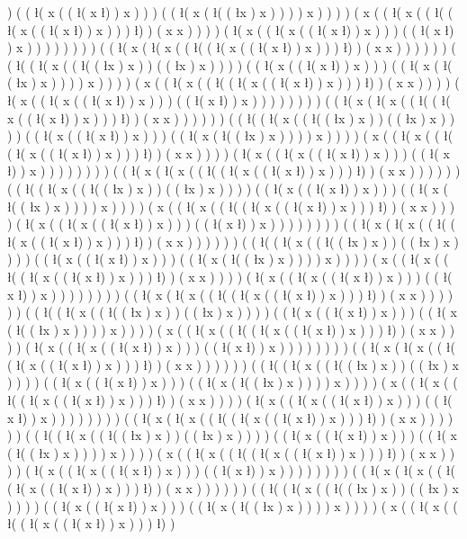 ) ( ( \l ( x ( ( \l ( x \l ) ) x ) ) ) ( ( \l ( x ( \l ( ( \l x ) x ) ) ) ) x ) ) ) ) ( x ( ( \l ( x ( ( \l ( ( \l ( x ( ( \l ( x \l ) ) x ) ) ) \l ) ) ( x x ) ) ) ) ( \l ( x ( ( \l ( x ( ( \l ( x \l ) ) x ) ) ) ( ( \l ( x \l ) ) x ) ) ) ) ) ) ) ) ( ( \l ( x ( \l ( x ( ( \l ( ( \l ( x ( ( \l ( x \l ) ) x ) ) ) \l ) ) ( x x ) ) ) ) ) ) ( ( \l ( ( \l ( x ( ( \l ( ( \l x ) x ) ) ( ( \l x ) x ) ) ) ) ( ( \l ( x ( ( \l ( x \l ) ) x ) ) ) ( ( \l ( x ( \l ( ( \l x ) x ) ) ) ) x ) ) ) ) ( x ( ( \l ( x ( ( \l ( ( \l ( x ( ( \l ( x \l ) ) x ) ) ) \l ) ) ( x x ) ) ) ) ( \l ( x ( ( \l ( x ( ( \l ( x \l ) ) x ) ) ) ( ( \l ( x \l ) ) x ) ) ) ) ) ) ) ) ( ( \l ( x ( \l ( x ( ( \l ( ( \l ( x ( ( \l ( x \l ) ) x ) ) ) \l ) ) ( x x ) ) ) ) ) ) ( ( \l ( ( \l ( x ( ( \l ( ( \l x ) x ) ) ( ( \l x ) x ) ) ) ) ( ( \l ( x ( ( \l ( x \l ) ) x ) ) ) ( ( \l ( x ( \l ( ( \l x ) x ) ) ) ) x ) ) ) ) ( x ( ( \l ( x ( ( \l ( ( \l ( x ( ( \l ( x \l ) ) x ) ) ) \l ) ) ( x x ) ) ) ) ( \l ( x ( ( \l ( x ( ( \l ( x \l ) ) x ) ) ) ( ( \l ( x \l ) ) x ) ) ) ) ) ) ) ) ( ( \l ( x ( \l ( x ( ( \l ( ( \l ( x ( ( \l ( x \l ) ) x ) ) ) \l ) ) ( x x ) ) ) ) ) ) ( ( \l ( ( \l ( x ( ( \l ( ( \l x ) x ) ) ( ( \l x ) x ) ) ) ) ( ( \l ( x ( ( \l ( x \l ) ) x ) ) ) ( ( \l ( x ( \l ( ( \l x ) x ) ) ) ) x ) ) ) ) ( x ( ( \l ( x ( ( \l ( ( \l ( x ( ( \l ( x \l ) ) x ) ) ) \l ) ) ( x x ) ) ) ) ( \l ( x ( ( \l ( x ( ( \l ( x \l ) ) x ) ) ) ( ( \l ( x \l ) ) x ) ) ) ) ) ) ) ) ( ( \l ( x ( \l ( x ( ( \l ( ( \l ( x ( ( \l ( x \l ) ) x ) ) ) \l ) ) ( x x ) ) ) ) ) ) ( ( \l ( ( \l ( x ( ( \l ( ( \l x ) x ) ) ( ( \l x ) x ) ) ) ) ( ( \l ( x ( ( \l ( x \l ) ) x ) ) ) ( ( \l ( x ( \l ( ( \l x ) x ) ) ) ) x ) ) ) ) ( x ( ( \l ( x ( ( \l ( ( \l ( x ( ( \l ( x \l ) ) x ) ) ) \l ) ) ( x x ) ) ) ) ( \l ( x ( ( \l ( x ( ( \l ( x \l ) ) x ) ) ) ( ( \l ( x \l ) ) x ) ) ) ) ) ) ) ) ( ( \l ( x ( \l ( x ( ( \l ( ( \l ( x ( ( \l ( x \l ) ) x ) ) ) \l ) ) ( x x ) ) ) ) ) ) ( ( \l ( ( \l ( x ( ( \l ( ( \l x ) x ) ) ( ( \l x ) x ) ) ) ) ( ( \l ( x ( ( \l ( x \l ) ) x ) ) ) ( ( \l ( x ( \l ( ( \l x ) x ) ) ) ) x ) ) ) ) ( x ( ( \l ( x ( ( \l ( ( \l ( x ( ( \l ( x \l ) ) x ) ) ) \l ) ) ( x x ) ) ) ) ( \l ( x ( ( \l ( x ( ( \l ( x \l ) ) x ) ) ) ( ( \l ( x \l ) ) x ) ) ) ) ) ) ) ) ( ( \l ( x ( \l ( x ( ( \l ( ( \l ( x ( ( \l ( x \l ) ) x ) ) ) \l ) ) ( x x ) ) ) ) ) ) ( ( \l ( ( \l ( x ( ( \l ( ( \l x ) x ) ) ( ( \l x ) x ) ) ) ) ( ( \l ( x ( ( \l ( x \l ) ) x ) ) ) ( ( \l ( x ( \l ( ( \l x ) x ) ) ) ) x ) ) ) ) ( x ( ( \l ( x ( ( \l ( ( \l ( x ( ( \l ( x \l ) ) x ) ) ) \l ) ) ( x x ) ) ) ) ( \l ( x ( ( \l ( x ( ( \l ( x \l ) ) x ) ) ) ( ( \l ( x \l ) ) x ) ) ) ) ) ) ) ) ( ( \l ( x ( \l ( x ( ( \l ( ( \l ( x ( ( \l ( x \l ) ) x ) ) ) \l ) ) ( x x ) ) ) ) ) ) ( ( \l ( ( \l ( x ( ( \l ( ( \l x ) x ) ) ( ( \l x ) x ) ) ) ) ( ( \l ( x ( ( \l ( x \l ) ) x ) ) ) ( ( \l ( x ( \l ( ( \l x ) x ) ) ) ) x ) ) ) ) ( x ( ( \l ( x ( ( \l ( ( \l ( x ( ( \l ( x \l ) ) x ) ) ) \l ) ) ( x x ) ) ) ) ( \l ( x ( ( \l ( x ( ( \l ( x \l ) ) x ) ) ) ( ( \l ( x \l ) ) x ) ) ) ) ) ) ) ) ( ( \l ( x ( \l ( x ( ( \l ( ( \l ( x ( ( \l ( x \l ) ) x ) ) ) \l ) ) ( x x ) ) ) ) ) ) ( ( \l ( ( \l ( x ( ( \l ( ( \l x ) x ) ) ( ( \l x ) x ) ) ) ) ( ( \l ( x ( ( \l ( x \l ) ) x ) ) ) ( ( \l ( x ( \l ( ( \l x ) x ) ) ) ) x ) ) ) ) ( x ( ( \l ( x ( ( \l ( ( \l ( x ( ( \l ( x \l ) ) x ) ) ) \l ) ) 